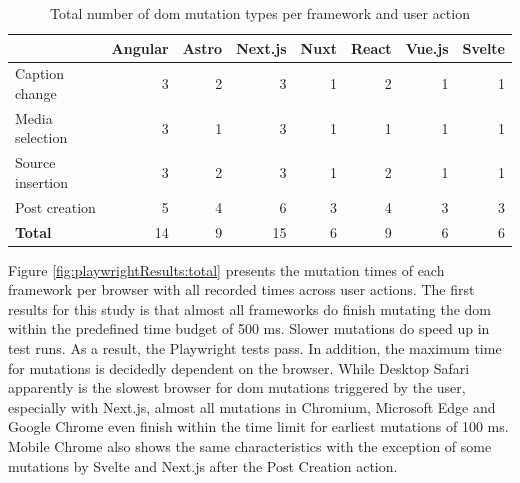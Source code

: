 \documentclass[a4paper, 12pt]{article}
\begin{document}
\begin{table}[!ht]
  \centering
  {
    \small
    \begin{adjustbox}{angle=00}
      \begin{tabular}{|l|r|r|r|r|r|r|r|}
        \hline
        ~                       & \textbf{Angular}  & \textbf{Astro}  & \textbf{Next.js}  & \textbf{Nuxt} & \textbf{React}  & \textbf{Vue.js} & \textbf{Svelte} \\ \hline
        Caption change          & 3                 & 2               & 3                 & 1             & 2               & 1               & 1               \\ \hline
        Media selection         & 3                 & 1               & 3                 & 1             & 1               & 1               & 1               \\ \hline
        Source insertion        & 3                 & 2               & 3                 & 1             & 2               & 1               & 1               \\ \hline
        Post creation           & 5                 & 4               & 6                 & 3             & 4               & 3               & 3               \\ \hline\hline
        \textbf{Total}          & 14                & 9               & 15                & 6             & 9               & 6               & 6               \\ \hline
      \end{tabular}
    \end{adjustbox}
  }
  \caption{Total number of \acrshort{dom} mutation types per framework and user action}
  \label{tab:mutations:total}
\end{table}

Figure \ref{fig:playwrightResults:total} presents the mutation times of each framework per browser with all recorded times across user actions.
The first results for this study is that almost all frameworks do finish mutating the \acrshort{dom} within the predefined time budget of 500 ms.
Slower mutations do speed up in test runs.
As a result, the Playwright tests pass.
In addition, the maximum time for mutations is decidedly dependent on the browser.
While Desktop Safari apparently is the slowest browser for \acrshort{dom} mutations triggered by the user, especially with Next.js, almost all mutations in Chromium, Microsoft Edge and Google Chrome even finish within the time limit for earliest mutations of 100 ms.
Mobile Chrome also shows the same characteristics with the exception of some mutations by Svelte and Next.js after the Post Creation action.
\end{document}
